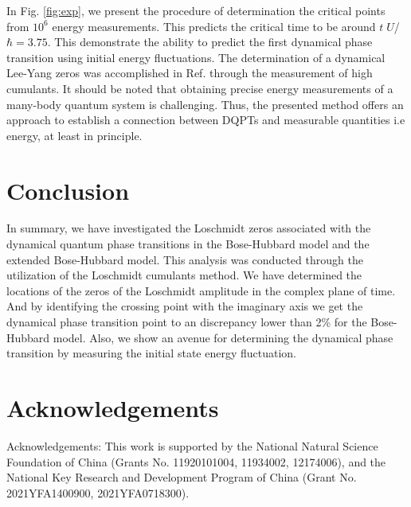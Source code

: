 \documentclass[%
reprint,
superscriptaddress,
amsmath,amssymb,
aps,
pra,
floatfix,
]{revtex4-1}
\begin{document}
In Fig. \ref{fig:exp}, we present the procedure of determination the critical points from $10^6$ energy measurements.  This predicts the critical time to be around $t\;U $/$\hbar=3.75$. This demonstrate the ability to predict the first dynamical phase transition using initial energy fluctuations. The determination of a dynamical Lee-Yang zeros was accomplished in Ref. \cite{brandner2017} through the measurement of high cumulants. 
It should be noted that obtaining precise energy measurements of a many-body quantum system is challenging. Thus, the presented method offers an approach to establish a connection between DQPTs and measurable quantities i.e energy, at least in principle.

%




\section{Conclusion}
In summary, we have investigated the Loschmidt zeros associated with the dynamical quantum phase transitions in the Bose-Hubbard model and the extended Bose-Hubbard model. This analysis was conducted through the utilization of the Loschmidt cumulants method. We have determined the locations of the zeros of the Loschmidt amplitude in the complex plane of time. And by identifying the crossing point with the imaginary axis we get the dynamical phase transition point to an discrepancy lower than 2\% for the Bose-Hubbard model. Also, we show an avenue for determining the dynamical phase transition by measuring the initial state energy fluctuation.


\section*{Acknowledgements}
Acknowledgements: This work is supported by the National Natural Science Foundation of China (Grants No. 11920101004,  11934002, 12174006), and the National Key Research and Development Program of China (Grant No. 2021YFA1400900, 2021YFA0718300).
\end{document}
